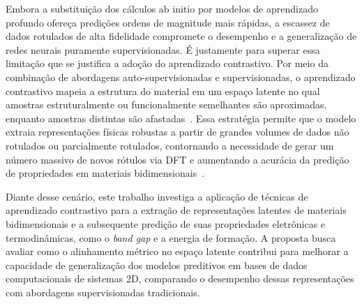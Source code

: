 Embora a substituição dos cálculos ab initio por modelos de aprendizado profundo ofereça predições ordens de magnitude mais rápidas, a escassez de dados rotulados de alta fidelidade compromete o desempenho e a generalização de redes neurais puramente supervisionadas. É justamente para superar essa limitação que se justifica a adoção do aprendizado contrastivo. Por meio da combinação de abordagens auto-supervisionadas e supervisionadas, o aprendizado contrastivo mapeia a estrutura do material em um espaço latente no qual amostras estruturalmente ou funcionalmente semelhantes são aproximadas, enquanto amostras distintas são afastadas~\cite{koker2022graph,moro2025multimodal}. Essa estratégia permite que o modelo extraia representações físicas robustas a partir de grandes volumes de dados não rotulados ou parcialmente rotulados, contornando a necessidade de gerar um número massivo de novos rótulos via DFT e aumentando a acurácia da predição de propriedades em materiais bidimensionais~\cite{van2026survey}.

Diante desse cenário, este trabalho investiga a aplicação de técnicas de aprendizado contrastivo para a extração de representações latentes de materiais bidimensionais e a subsequente predição de suas propriedades eletrônicas e termodinâmicas, como o \textit{band gap} e a energia de formação. A proposta busca avaliar como o alinhamento métrico no espaço latente contribui para melhorar a capacidade de generalização dos modelos preditivos em bases de dados computacionais de sistemas 2D, comparando o desempenho dessas representações com abordagens supervisionadas tradicionais.

